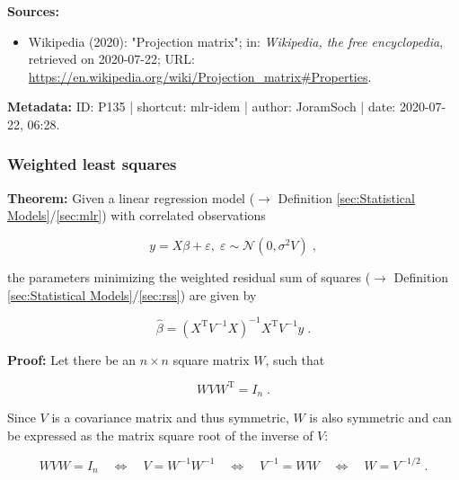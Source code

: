 \documentclass[a4paper,12pt,twoside]{book}
\begin{document}
\vspace{1em}
\textbf{Sources:}
\begin{itemize}
\item Wikipedia (2020): "Projection matrix"; in: \textit{Wikipedia, the free encyclopedia}, retrieved on 2020-07-22; URL: \url{https://en.wikipedia.org/wiki/Projection_matrix#Properties}.
\end{itemize}


\vspace{1em}
\textbf{Metadata:} ID: P135 | shortcut: mlr-idem | author: JoramSoch | date: 2020-07-22, 06:28.
\vspace{1em}



\subsubsection[\textbf{Weighted least squares}]{Weighted least squares} \label{sec:mlr-wls}
\setcounter{equation}{0}

\textbf{Theorem:} Given a linear regression model ($\rightarrow$ Definition \ref{sec:Statistical Models}/\ref{sec:mlr}) with correlated observations

\begin{equation} \label{eq:mlr-wls-MLR}
y = X\beta + \varepsilon, \; \varepsilon \sim \mathcal{N}(0, \sigma^2 V) \; ,
\end{equation}

the parameters minimizing the weighted residual sum of squares ($\rightarrow$ Definition \ref{sec:Statistical Models}/\ref{sec:rss}) are given by

\begin{equation} \label{eq:mlr-wls-WLS}
\hat{\beta} = (X^\mathrm{T} V^{-1} X)^{-1} X^\mathrm{T} V^{-1} y \; .
\end{equation}


\vspace{1em}
\textbf{Proof:} Let there be an $n \times n$ square matrix $W$, such that

\begin{equation} \label{eq:mlr-wls-W-def}
W V W^\mathrm{T} = I_n \; .
\end{equation}

Since $V$ is a covariance matrix and thus symmetric, $W$ is also symmetric and can be expressed as the matrix square root of the inverse of $V$:

\begin{equation} \label{eq:mlr-wls-W-V}
W V W = I_n \quad \Leftrightarrow \quad V = W^{-1} W^{-1} \quad \Leftrightarrow \quad V^{-1} = W W \quad \Leftrightarrow \quad W = V^{-1/2} \; .
\end{equation}
\end{document}
